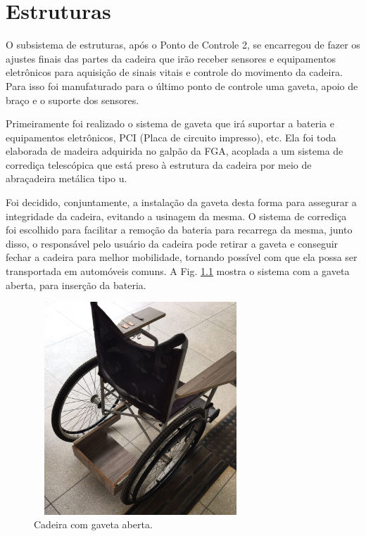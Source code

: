 \chapter{Estruturas}
\label{chapter:estruturas}

O subsistema de estruturas, após o Ponto de Controle 2, se encarregou de fazer os ajustes finais das partes da cadeira que irão receber sensores e equipamentos eletrônicos para aquisição de sinais vitais e controle do movimento da cadeira. Para isso foi manufaturado para o último ponto de controle uma gaveta, apoio de braço e o suporte dos sensores.

Primeiramente foi realizado o sistema de gaveta que irá suportar a bateria e equipamentos eletrônicos, PCI (Placa de circuito impresso), etc. Ela foi toda elaborada de madeira adquirida no galpão da FGA, acoplada a um sistema de corrediça telescópica que está preso à estrutura da cadeira por meio de abraçadeira metálica tipo u.

Foi decidido, conjuntamente, a instalação da gaveta desta forma para assegurar a integridade da cadeira, evitando a usinagem da mesma. O sistema de corrediça foi escolhido para facilitar a remoção da bateria para recarrega da mesma, junto disso, o responsável pelo usuário da cadeira pode retirar a gaveta e conseguir fechar a cadeira para melhor mobilidade, tornando possível com que ela possa ser transportada em automóveis comuns. A Fig. \ref{fig:gaveta_aberta} mostra o sistema com a gaveta aberta, para inserção da bateria.

\begin{figure}
    \begin{center}
        \includegraphics[width=8cm,height=8cm,keepaspectratio]{figuras/gaveta_aberta.png}
    \end{center}
    \caption{Cadeira com gaveta aberta.}
    \label{fig:gaveta_aberta}
\end{figure}

